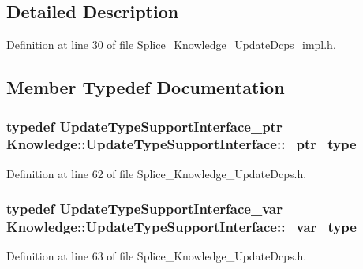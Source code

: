 \subsection{Detailed Description}


Definition at line 30 of file Splice\_\-Knowledge\_\-UpdateDcps\_\-impl.h.



\subsection{Member Typedef Documentation}
\hypertarget{classKnowledge_1_1UpdateTypeSupportInterface_a35b969e998255d5c4a68cf2887debd92}{
\subsubsection[{\_\-ptr\_\-type}]{\setlength{\rightskip}{0pt plus 5cm}typedef {\bf UpdateTypeSupportInterface\_\-ptr} {\bf Knowledge::UpdateTypeSupportInterface::\_\-ptr\_\-type}}}
\label{d6/d97/classKnowledge_1_1UpdateTypeSupportInterface_a35b969e998255d5c4a68cf2887debd92}


Definition at line 62 of file Splice\_\-Knowledge\_\-UpdateDcps.h.

\hypertarget{classKnowledge_1_1UpdateTypeSupportInterface_afb29ad9f293bdad6236737eeb811774a}{
\subsubsection[{\_\-var\_\-type}]{\setlength{\rightskip}{0pt plus 5cm}typedef {\bf UpdateTypeSupportInterface\_\-var} {\bf Knowledge::UpdateTypeSupportInterface::\_\-var\_\-type}}}
\label{d6/d97/classKnowledge_1_1UpdateTypeSupportInterface_afb29ad9f293bdad6236737eeb811774a}


Definition at line 63 of file Splice\_\-Knowledge\_\-UpdateDcps.h.



